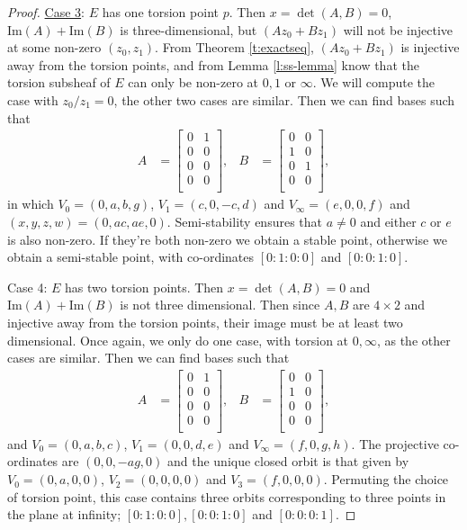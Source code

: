 \begin{proof}
		\underline{Case 3}: $E$ has one torsion point $p$. Then $x = \det(A,B) =0$, $\text{Im}(A) + \text{Im}(B)$ is three-dimensional, but $(Az_0 + Bz_1)$ will not be injective at some non-zero $(z_0,z_1)$. From Theorem \ref{t:exactseq}, $(Az_0+Bz_1)$ is injective away from the torsion points, and from Lemma \ref{l:ss-lemma} know that the torsion subsheaf of $E$ can only be non-zero at $0,1$ or $\infty$. We will compute the case with $z_0/z_1 = 0$, the other two cases are similar. Then we can find bases such that
		\begin{align*}
		A &= \begin{bmatrix}
		0 & 1\\
		0 & 0\\
		0 & 0\\
		0 & 0\\
		\end{bmatrix}, & 
		B &= \begin{bmatrix}
		0 & 0\\
		1 & 0\\
		0 & 1\\
		0 & 0\\
		\end{bmatrix},
		\end{align*}
		in which $V_0 = (0,a,b,g)$, $V_1 = (c,0,-c,d)$ and $V_\infty = (e,0,0,f)$ and $(x,y,z,w) = (0,ac,ae,0)$. Semi-stability ensures that $a\neq 0$ and either $c$ or $e$ is also non-zero. If they're both non-zero we obtain a stable point, otherwise we obtain a semi-stable point, with co-ordinates $[0:1:0:0]$ and $[0:0:1:0]$.
		
		Case 4: $E$ has two torsion points. Then $x=\det(A,B)=0$ and $\text{Im}(A)+\text{Im}(B)$ is not three dimensional. Then since $A,B$ are $4\times 2$ and injective away from the torsion points, their image must be at least two dimensional. Once again, we only do one case, with torsion at $0,\infty$, as the other cases are similar. Then we can find bases such that
		\begin{align*}
		A &= \begin{bmatrix}
		0 & 1\\
		0 & 0\\
		0 & 0\\
		0 & 0\\
		\end{bmatrix}, & 
		B &= \begin{bmatrix}
		0 & 0\\
		1 & 0\\
		0 & 0\\
		0 & 0\\
		\end{bmatrix},
		\end{align*}
		and $V_0 = (0,a,b,c)$, $V_1 = (0,0,d,e)$ and $V_\infty = (f,0,g,h)$. The projective co-ordinates are $(0,0,-ag,0)$ and the unique closed orbit is that given by $V_0 = (0,a,0,0)$, $V_2 = (0,0,0,0)$ and $V_3 = (f,0,0,0)$. Permuting the choice of torsion point, this case contains three orbits corresponding to three points in the plane at infinity; $[0:1:0:0], [0:0:1:0]$ and $[0:0:0:1]$.
		

\end{proof}
